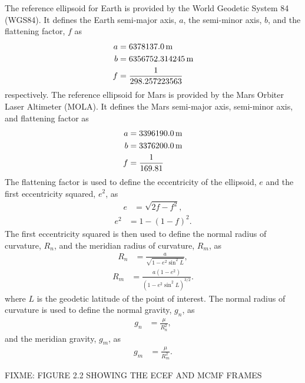 \documentclass[12pt]{article}
\numberwithin{equation}{section}
\numberwithin{figure}{section}
\numberwithin{table}{section}
\begin{document}
The reference ellipsoid for Earth is provided by the World Geodetic System 84 (WGS84). It defines the Earth semi-major axis, $a$, the semi-minor axis, $b$, and the flattening factor, $f$ as
\begin{gather*}
    \setlength\jot{-2ex}
    \begin{aligned}
        a &= 6378137.0\,\text{m} \\
        b &= 6356752.314245\,\text{m} \\
        f &= \frac{1}{298.257223563}
    \end{aligned}
\end{gather*}
respectively. The reference ellipsoid for Mars is provided by the Mars Orbiter Laser Altimeter (MOLA). It defines the Mars semi-major axis, semi-minor axis, and flattening factor as
\begin{gather*}
    \setlength\jot{-2ex}
    \begin{aligned}
        a &= 3396190.0\,\text{m} \\
        b &= 3376200.0\,\text{m} \\
        f &= \frac{1}{169.81}
    \end{aligned}
\end{gather*}
The flattening factor is used to define the eccentricity of the ellipsoid, $e$ and the first eccentricity squared, $e^2$, as
\begin{align}
    e &= \sqrt{2f - f^2},
\end{align}
\begin{align}
    e^2 &= 1 - {(1 - f)}^2.
\end{align}
The first eccentricity squared is then used to define the normal radius of curvature, $R_n$, and the meridian radius of curvature, $R_m$, as
\begin{align}
    R_n &= \frac{a}{\sqrt{1 - e^2\sin^2L}},
\end{align}
\begin{align}
    R_m &= \frac{a(1 - e^2)}{{(1 - e^2\sin^2L)}^{3/2}}.
\end{align}
where $L$ is the geodetic latitude of the point of interest.
The normal radius of curvature is used to define the normal gravity, $g_n$, as
\begin{align}
    g_n &= \frac{\mu}{R_n^2},
\end{align}
and the meridian gravity, $g_m$, as
\begin{align}
    g_m &= \frac{\mu}{R_m^2}.
\end{align}

FIXME: FIGURE 2.2 SHOWING THE ECEF AND MCMF FRAMES
\end{document}
